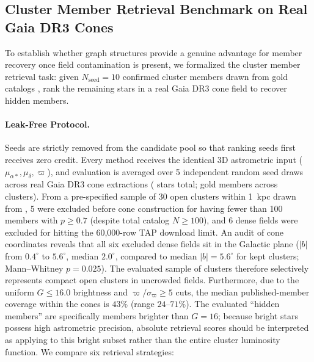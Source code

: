 \documentclass[preprint,12pt,authoryear]{elsarticle}
\begin{document}
\subsection{Cluster Member Retrieval Benchmark on Real Gaia DR3 Cones}
\label{sec:retrieval_benchmark}

To establish whether graph structures provide a genuine advantage for member recovery once field contamination is present, we formalized the cluster member retrieval task: given $N_{\mathrm{seed}} = 10$ confirmed cluster members drawn from gold catalogs \citep{Hunt2023}, rank the remaining stars in a real Gaia DR3 cone field to recover hidden members.

\paragraph{Leak-Free Protocol.}
Seeds are strictly removed from the candidate pool so that ranking seeds first receives zero credit. Every method receives the identical 3D astrometric input ($\mu_{\alpha*}, \mu_\delta, \varpi$), and evaluation is averaged over 5 independent random seed draws across real Gaia DR3 cone extractions (\nConeStars{} stars total; \nPublishedInCones{} gold members across \nMembClusters{} clusters). From a pre-specified sample of 30 open clusters within 1~kpc drawn from \citet{Hunt2023}, 5 were excluded before cone construction for having fewer than 100 members with $p \ge 0.7$ (despite total catalog $N \ge 100$), and 6 dense fields were excluded for hitting the 60,000-row TAP download limit. An audit of cone coordinates reveals that all six excluded dense fields sit in the Galactic plane ($|b|$ from $0.4^\circ$ to $5.6^\circ$, median $2.0^\circ$, compared to median $|b| = 5.6^\circ$ for kept clusters; Mann--Whitney $p = 0.025$). The evaluated sample of \nMembClusters{} clusters therefore selectively represents compact open clusters in uncrowded fields. Furthermore, due to the uniform $G \le 16.0$ brightness and $\varpi/\sigma_\varpi \ge 5$ cuts, the median published-member coverage within the cones is $43\%$ (range $24$--$71\%$). The evaluated ``hidden members'' are specifically members brighter than $G = 16$; because bright stars possess high astrometric precision, absolute retrieval scores should be interpreted as applying to this bright subset rather than the entire cluster luminosity function. We compare six retrieval strategies:
\end{document}
